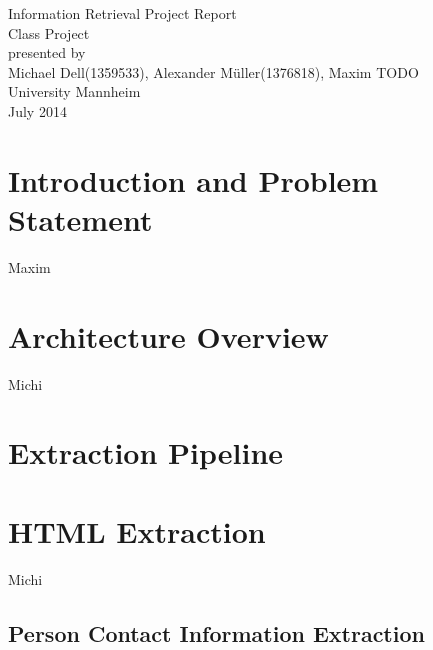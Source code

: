 \documentclass[11pt,titlepage,oneside,openany]{article}
\begin{document}
\begin{titlepage}
	\vspace*{2cm}
  \begin{center}
   {\Large Information Retrieval Project Report \\}
   \vspace{2cm} 
   {Class Project\\}
   \vspace{2cm}
   {presented by\\
    Michael Dell(1359533), Alexander Müller(1376818), Maxim TODO  \\
    
   }
   \vspace{1cm} 
   {
    University Mannheim\\} \vspace{2cm}
   {July 2014}
  \end{center}
\end{titlepage} 

\newpage





\newpage


\section{Introduction and Problem Statement}
Maxim
\section{Architecture Overview}
Michi
\section{Extraction Pipeline}
\section{HTML Extraction}
Michi
\subsection{Person Contact Information Extraction}
\end{document}

